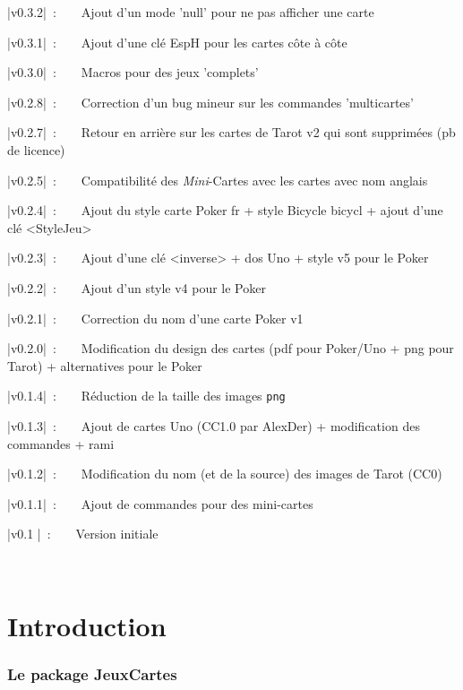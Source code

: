 \documentclass[a4paper]{article}
\begin{document}
{\small \bverb|v0.3.2|~:~~~~Ajout d'un mode 'null' pour ne pas afficher une carte}

{\small \bverb|v0.3.1|~:~~~~Ajout d'une clé \textsf{EspH} pour les cartes côte à côte}

{\small \bverb|v0.3.0|~:~~~~Macros pour des jeux 'complets'}

{\small \bverb|v0.2.8|~:~~~~Correction d'un bug mineur sur les commandes 'multicartes'}

{\small \bverb|v0.2.7|~:~~~~Retour en arrière sur les cartes de Tarot \textsf{v2} qui sont supprimées (pb de licence)}

{\small \bverb|v0.2.5|~:~~~~Compatibilité des \textit{Mini}-Cartes avec les cartes avec nom anglais}

{\small \bverb|v0.2.4|~:~~~~Ajout du style carte Poker \textsf{fr} + style Bicycle \textsf{bicycl} + ajout d'une clé \textsf{<StyleJeu>}}

{\small \bverb|v0.2.3|~:~~~~Ajout d'une clé \textsf{<inverse>} + dos Uno + style \textsf{v5} pour le Poker}

{\small \bverb|v0.2.2|~:~~~~Ajout d'un style \textsf{v4} pour le Poker}

{\small \bverb|v0.2.1|~:~~~~Correction du nom d'une carte Poker \textsf{v1}}

{\small \bverb|v0.2.0|~:~~~~Modification du design des cartes (pdf pour Poker/Uno + png pour Tarot) + alternatives pour le Poker}

{\small \bverb|v0.1.4|~:~~~~Réduction de la taille des images \texttt{png}}

{\small \bverb|v0.1.3|~:~~~~Ajout de cartes Uno (CC1.0 par AlexDer) + modification des commandes + rami}

{\small \bverb|v0.1.2|~:~~~~Modification du nom (et de la source) des images de Tarot (CC0)}

{\small \bverb|v0.1.1|~:~~~~Ajout de commandes pour des mini-cartes}

{\small \bverb|v0.1  |~:~~~~Version initiale}

\vfill~

\newpage

\part*{Introduction}

\section{Le package JeuxCartes}
\end{document}
